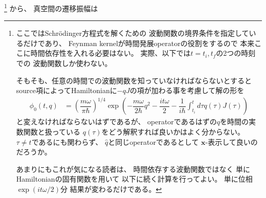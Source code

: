 \footnote{
    ここではSchr\"odinger方程式を解くための
    波動関数の境界条件を指定しているだけであり、
    Feynman kernelが時間発展operatorの役割をするので
    本来ここに時間依存性を入れる必要はない。
    実際、以下では$t = t_i, t_f$の2つの時刻での
    波動関数しか使わない。

    そもそも、任意の時間での波動関数を知っていなければならないとすると
    source項によってHamiltonianに$-qJ$の項が加わる事を考慮して解の形を
    \begin{align}
        \phi_0  (t, q)
        &=
        \left(
            \dfrac{m \omega}{\pi \hbar}        
        \right)^{1/4}
        \exp(
            - \dfrac{m \omega}{2 \hbar} q^2
            -
            \dfrac{i t \omega}{2}
        -
            \dfrac{1}{i \hbar}
            \int_{t_i}^t d\tau
            q(\tau)
            J(\tau)
        )
    \end{align}
    と変えなければならないはずであるが、
    operatorであるはずの$q$を時間の実数関数と扱っている
    $q(\tau)$をどう解釈すれば良いかはよく分からない。
    $\tau \neq t$であるにも関わらず、
    $\hat{q}$と同じoperatorであるとして
    $\bm{x}$-表示して良いのだろうか。

    あまりにもこれが気になる読者は、
    時間依存する波動関数ではなく
    単にHamiltonianの固有関数を用いて
    以下に続く計算を行ってよい。
    単に位相$\exp(i t \omega / 2)$分
    結果が変わるだけである。
}
から、
真空間の遷移振幅は
